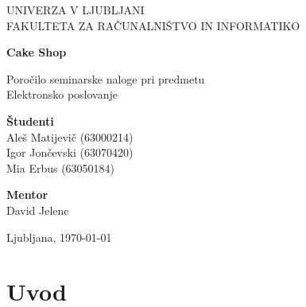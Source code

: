 \documentclass[a4paper,12pt]{report}
\newcommand{\naslov}     {Cake Shop}
\newcommand{\prviavtor}  {Aleš Matijevič}
\newcommand{\prviindeks} {63000214}
\newcommand{\drugiavtor} {Igor Jončevski}
\newcommand{\drugiindeks}{63070420}
\newcommand{\tretjiavtor}{Mia Erbus}
\newcommand{\tretjiindeks}{63050184}
\newcommand{\kraj}       {Ljubljana}
\begin{document}
\begin{titlepage}
	\begin{center}
	{UNIVERZA V LJUBLJANI\\[10pt] 
	FAKULTETA ZA RAČUNALNIŠTVO IN INFORMATIKO}

	\vspace{65mm}

	{\Large\textbf{\naslov}}

	\vspace{10mm}

	{\large Poročilo seminarske naloge pri predmetu\\[10pt] Elektronsko poslovanje}

	\vfill
	\vspace{60mm}

\hspace{20mm}
\begin{minipage}[t]{70mm}
	{\bf Študenti}\\
	{\prviavtor} ({\prviindeks})\\ 
	{\drugiavtor} ({\drugiindeks})\\
	{\tretjiavtor} ({\tretjiindeks})
\end{minipage}
\begin{minipage}[t]{50mm}
	{\bf Mentor}\\
	David Jelenc
\end{minipage}

	\vspace{40mm}

	{	\kraj, \today}
	\end{center}
\end{titlepage}


\tableofcontents

\chapter{Uvod}
\end{document}
